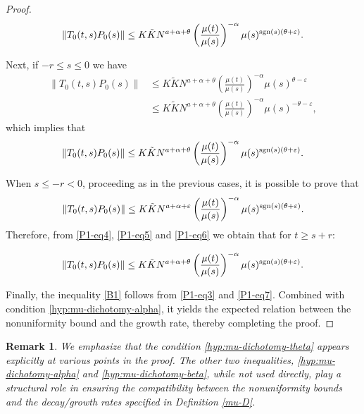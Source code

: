 \documentclass[9pt]{amsart}
\newtheorem{remark}{Remark}
\numberwithin{equation}{section}
\numberwithin{lemma}{section}
\begin{document}
\begin{proof}
    \begin{equation}\label{P1-eq4}
        \|T_0(t,s)P_0(s)\| \leq K\tilde{K}N^{a+\alpha+\theta}\left(\frac{\mu(t)}{\mu(s)}\right)^{-\alpha}\mu(s)^{\textnormal{sgn}(s)(\theta+\varepsilon)}.
    \end{equation}

    Next, if $-r\leq s\leq0$ we have
    \begin{align*}
       \|T_0(t,s)P_0(s)\| &\leq  K\tilde{K}N^{a+\alpha+\theta}\left(\frac{\mu(t)}{\mu(s)}\right)^{-\alpha} \mu(s)^{\theta-\varepsilon}\\
       &\leq K\tilde{K}N^{a+\alpha+\theta}\left(\frac{\mu(t)}{\mu(s)}\right)^{-\alpha} \mu(s)^{-\theta-\varepsilon},
    \end{align*}
    which implies that
    \begin{equation}\label{P1-eq5}
        \|T_0(t,s)P_0(s)\|\leq K\tilde{K}N^{a+\alpha+\theta}\left(\frac{\mu(t)}{\mu(s)}\right)^{-\alpha}\mu(s)^{\textnormal{sgn}(s)(\theta+\varepsilon)}.
    \end{equation}

    When $s\leq-r<0$, proceeding as in the previous cases, it is possible to prove that
    \begin{equation}\label{P1-eq6}
        \|T_0(t,s)P_0(s)\|\leq K\tilde{K}N^{a+\alpha+\varepsilon}\left(\frac{\mu(t)}{\mu(s)}\right)^{-\alpha}\mu(s)^{\textnormal{sgn}(s)(\theta+\varepsilon)}.
    \end{equation}
    Therefore, from \eqref{P1-eq4}, \eqref{P1-eq5} and \eqref{P1-eq6} we obtain that for $t\geq s+r$:

    \begin{equation}\label{P1-eq7}
        \|T_0(t,s)P_0(s)\|\leq K\tilde{K}N^{a+\alpha+\theta}\left(\frac{\mu(t)}{\mu(s)}\right)^{-\alpha}\mu(s)^{\textnormal{sgn}(s)(\theta+\varepsilon)}.
    \end{equation}

    Finally, the inequality \eqref{B1} follows from \eqref{P1-eq3} and \eqref{P1-eq7}. Combined with condition \eqref{hyp:mu-dichotomy-alpha}, it yields the expected relation between the nonuniformity bound and the growth rate, thereby completing the proof.

   



\end{proof}

 \begin{remark}
We emphasize that the condition \eqref{hyp:mu-dichotomy-theta} appears explicitly at various points in the proof. The other two inequalities, \eqref{hyp:mu-dichotomy-alpha} and \eqref{hyp:mu-dichotomy-beta}, while not used directly, play a structural role in ensuring the compatibility between the nonuniformity bounds and the decay/growth rates specified in Definition \ref{mu-D}.
\end{remark}
\end{document}

